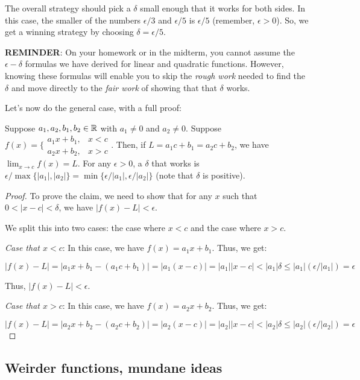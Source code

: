 \documentclass[10pt]{amsart}
\begin{document}
The overall strategy should pick a $\delta$ small enough that it works
for both sides. In this case, the smaller of the numbers $\epsilon/3$
and $\epsilon/5$ is $\epsilon/5$ (remember, $\epsilon > 0$). So, we
get a winning strategy by choosing $\delta = \epsilon/5$.

{\bf REMINDER}: On your homework or in the midterm, you cannot assume the
$\epsilon-\delta$ formulas we have derived for linear and quadratic
functions. However, knowing these formulas will enable you to skip the
{\em rough work} needed to find the $\delta$ and move directly to the
{\em fair work} of showing that that $\delta$ works.

Let's now do the general case, with a full proof:

\begin{claimer}
  Suppose $a_1,a_2,b_1,b_2 \in \mathbb{R}$ with $a_1 \ne 0$ and $a_2 \ne
  0$. Suppose $f(x) = \lbrace\begin{array}{ll} a_1x + b_1, & x <
  c\\a_2x + b_2, & x > c\end{array}$. Then, if $L = a_1c + b_1 = a_2c + b_2$, we
  have $\lim_{x \to c} f(x) = L$. For any $\epsilon > 0$, a $\delta$
  that works is $\epsilon/\max\{|a_1|,|a_2| \} = \min \{
  \epsilon/|a_1|, \epsilon/|a_2|\}$ (note that $\delta$ is positive).
\end{claimer}

\begin{proof}
  To prove the claim, we need to show that for any $x$ such that $0 <
  |x - c| < \delta$, we have $|f(x) - L| < \epsilon$.

  We split this into two cases: the case where $x < c$ and the case
  where $x > c$.

  {\em Case that $x < c$}: In this case, we have $f(x) = a_1x +
  b_1$. Thus, we get:

  $$|f(x) - L| = |a_1x + b_1 - (a_1c + b_1)| = |a_1(x - c)| = |a_1||x - c| < |a_1|\delta \le |a_1|(\epsilon/|a_1|) = \epsilon$$

  Thus, $|f(x) - L| < \epsilon$.

  {\em Case that $x > c$}: In this case, we have $f(x) = a_2x +
  b_2$. Thus, we get:

  $$|f(x) - L| = |a_2x + b_2 - (a_2c + b_2)| = |a_2(x - c)| = |a_2||x - c| < |a_2|\delta \le |a_2|(\epsilon/|a_2|) = \epsilon$$
\end{proof}

\subsection{Weirder functions, mundane ideas}
\end{document}
